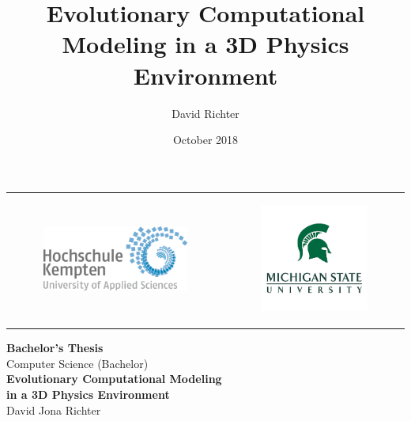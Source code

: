 \documentclass[12pt,oneside,listof=totoc,paper=a4,headings=small]{scrbook}
\title{Evolutionary Computational Modeling in a 3D Physics Environment}
\author{David Richter}
\date{October 2018}
\begin{document}
\frontmatter


\thispagestyle{empty}
\vspace*{-20mm}

{\centering
\begin{table}[h!]
\begin{tabular}{cc}
\begin{subfigure}{0.4\textwidth}\centering\includegraphics[width=0.75\columnwidth]{images/2000px-Logo_Hochschule_Kempten.png}\end{subfigure}&
\begin{subfigure}{0.4\textwidth}\centering\includegraphics[width=0.75\columnwidth]{images/81005.png}\end{subfigure}\\
\end{tabular}
\end{table}
}
\vspace*{1cm}
\begin{center}
{\Large \textbf{Bachelor's Thesis}}\\
\vspace*{0.5cm}
{\large Computer Science (Bachelor)\\[1mm]}
\vspace{0.5cm}
{\Large \bfseries Evolutionary Computational Modeling\\ in a 3D Physics Environment\\}
\vspace{1cm}
{\large David Jona Richter}\\[40mm]
\end{center}
\vfill
\end{document}
